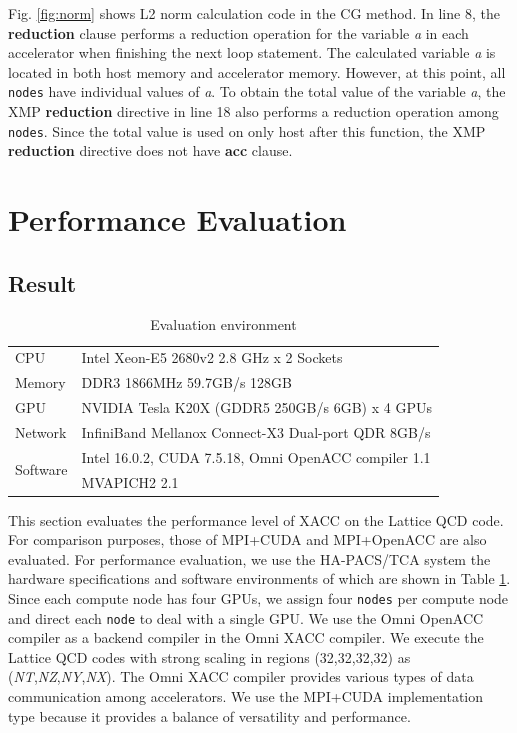 Fig. \ref{fig:norm} shows L2 norm calculation code in the CG method.
In line 8,
the {\bf reduction} clause performs a reduction operation for the variable {\it a} in each accelerator when finishing the next loop statement.
The calculated variable {\it a} is located in both host memory and accelerator memory.
However, at this point,
all {\tt nodes} have individual values of {\it a}.
To obtain the total value of the variable {\it a},
the XMP {\bf reduction} directive in line 18 also performs a reduction operation among {\tt nodes}.
Since the total value is used on only host after this function,
the XMP {\bf reduction} directive does not have {\bf acc} clause.

\section{Performance Evaluation}\label{sec:performance}
\subsection{Result}
\begin{table}[h]
\renewcommand{\arraystretch}{1.2}
\centering
\caption{Evaluation environment} \label{tab:ha-pacs/tca}
\begin{tabular}{l|l}\hline
CPU & Intel Xeon-E5 2680v2 2.8 GHz x 2 Sockets \\
Memory & DDR3 1866MHz 59.7GB/s 128GB \\
GPU & NVIDIA Tesla K20X (GDDR5 250GB/s 6GB) x 4 GPUs \\
Network & InfiniBand Mellanox Connect-X3 Dual-port QDR 8GB/s \\
\multirow{2}{*}{Software} & Intel 16.0.2, CUDA 7.5.18, Omni OpenACC compiler 1.1\\
 & MVAPICH2 2.1\\ \hline
\end{tabular}
\end{table}

This section evaluates the performance level of XACC on the Lattice QCD code.
For comparison purposes,
those of MPI+CUDA and MPI+OpenACC are also evaluated.
For performance evaluation,
we use the HA-PACS/TCA system\cite{hapacs} the hardware specifications and software environments of which are shown in Table \ref{tab:ha-pacs/tca}.
Since each compute node has four GPUs,
we assign four {\tt nodes} per compute node and direct each {\tt node} to deal with a single GPU.
We use the Omni OpenACC compiler\cite{2013tabuchi} as a backend compiler in the Omni XACC compiler.
We execute the Lattice QCD codes with strong scaling in regions (32,32,32,32) as ({\it NT},{\it NZ},{\it NY},{\it NX}).
The Omni XACC compiler provides various types of data communication among accelerators\cite{nakao2014}.
We use the MPI+CUDA implementation type because it provides a balance of versatility and performance.

